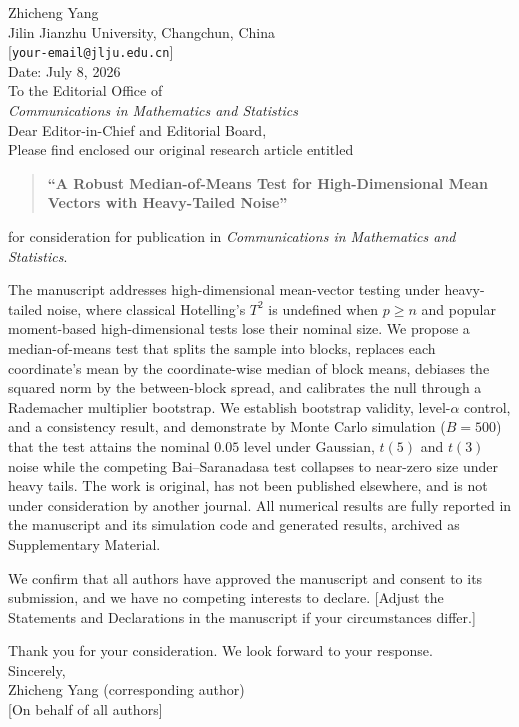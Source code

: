 \documentclass[11pt]{article}
\begin{document}
\noindent Zhicheng Yang \\{}
Jilin Jianzhu University, Changchun, China \\{}
[\texttt{your-email@jlju.edu.cn}] \\[6pt]
\noindent Date: July 8, 2026 \\[12pt]

\noindent To the Editorial Office of \\
\textit{Communications in Mathematics and Statistics} \\[12pt]

\noindent Dear Editor-in-Chief and Editorial Board, \\[6pt]

Please find enclosed our original research article entitled

\begin{quote}
\textbf{``A Robust Median-of-Means Test for High-Dimensional Mean Vectors with Heavy-Tailed Noise''}
\end{quote}

for consideration for publication in \textit{Communications in Mathematics and Statistics}.

The manuscript addresses high-dimensional mean-vector testing under heavy-tailed noise, where
classical Hotelling's $T^{2}$ is undefined when $p\ge n$ and popular moment-based high-dimensional
tests lose their nominal size. We propose a median-of-means test that splits the sample into
blocks, replaces each coordinate's mean by the coordinate-wise median of block means, debiases the
squared norm by the between-block spread, and calibrates the null through a Rademacher multiplier
bootstrap. We establish bootstrap validity, level-$\alpha$ control, and a consistency result, and
demonstrate by Monte Carlo simulation ($B=500$) that the test attains the nominal $0.05$ level
under Gaussian, $t(5)$ and $t(3)$ noise while the competing Bai--Saranadasa test collapses to
near-zero size under heavy tails. The work is original, has not been published elsewhere, and is
not under consideration by another journal. All numerical results are fully reported in the
manuscript and its simulation code and generated results, archived as Supplementary Material.

We confirm that all authors have approved the manuscript and consent to its submission, and we have
no competing interests to declare. [Adjust the Statements and Declarations in the manuscript if your
circumstances differ.]

Thank you for your consideration. We look forward to your response. \\[6pt]

\noindent Sincerely, \\[6pt]
\noindent Zhicheng Yang (corresponding author) \\{}
[On behalf of all authors]

\end{document}
